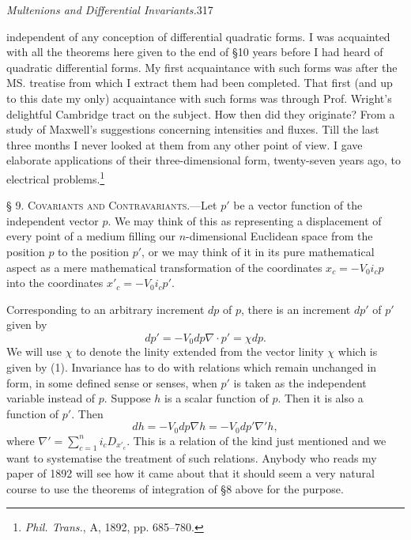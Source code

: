 \documentclass[11pt]{article}
\begin{document}
\newpage\thispagestyle{empty}\begin{center}\textit{Multenions and Differential Invariants.}\hfill 317\end{center}
independent of any conception of differential quadratic forms. I was acquainted with all the theorems here given to the end of §10 years before I had heard of quadratic differential forms. My first acquaintance with such forms was after the MS. treatise from which I extract them had been completed. That first (and up to this date my only) acquaintance with such forms was through Prof. Wright's delightful Cambridge tract on the subject. How then did they originate? From a study of Maxwell's suggestions concerning intensities and fluxes. Till the last three months I never looked at them from any other point of view. I gave elaborate applications of their three-dimensional form, twenty-seven years ago, to electrical problems.\footnote{\emph{Phil. Trans.}, A, 1892, pp. 685--780.}

\noindent\textsc{§ 9. Covariants and Contravariants.}---Let $p'$ be a vector function of the independent vector $p$. We may think of this as representing a displacement of every point of a medium filling our $n$-dimensional Euclidean space from the position $p$ to the position $p'$, or we may think of it in its pure mathematical aspect as a mere mathematical transformation of the coordinates $x_c=-V_0i_cp$ into the coordinates $x'_c=-V_0i_cp'$.

\indent Corresponding to an arbitrary increment $dp$ of $p$, there is an increment $dp'$ of $p'$ given by
\begin{equation}dp'=-V_0dp\nabla\cdot p'=\chi dp.\tag{1}\end{equation}
We will use $\chi$ to denote the linity extended from the vector linity $\chi$ which is given by (1). Invariance has to do with relations which remain unchanged in form, in some defined sense or senses, when $p'$ is taken as the independent variable instead of $p$. Suppose $h$ is a scalar function of $p$. Then it is also a function of $p'$. Then
\begin{equation}dh=-V_0dp\nabla h=-V_0dp'\nabla'h,\tag{2}\end{equation}
where $\nabla'=\sum_{c=1}^ni_cD_{x'_c}$. This is a relation of the kind just mentioned and we want to systematise the treatment of such relations. Anybody who reads my paper of 1892 will see how it came about that it should seem a very natural course to use the theorems of integration of §8 above for the purpose.
\end{document}
